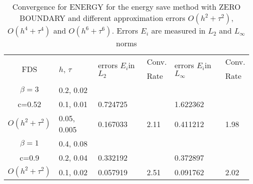 \documentclass{article}
\begin{document}
\begin{table}[ht]
\centering
\small
		\begin{tabular}{||c|l|ll|ll||}
			\hline
			\hline
      \multirow{2  }{*}{FDS}        & \multirow{2  }{*}{$h$, $\tau$}  & \multirow{2  }{*}{errors $E_i$in$L_2$}  &Conv.& \multirow{2  }{*}{errors $E_i$in$L_\infty$}  &Conv.  \\
	                                        &                                                     &                                                                 &  Rate &                                                                       & Rate \\
   			\hline 
					\hline 
  $\beta=3$                &0.2, 0.02         &                    &                &                  &                   \\
   c=0.52                     &0.1, 0.01         & 0.724725   &                & 1.622362  &                   \\
     $O(h^2 + \tau^ 2)$ &0.05, 0.005  & 0.167033   & 2.11       & 0.411212   & 1.98   \\
	   \hline
			\hline 
       $\beta=1$           & 0.4, 0.08       &                   &           &                 &   \\
                  c=0.9       & 0.2, 0.04        & 0.332192   &          &0.372897  &   \\
  $O(h^2+ \tau^2)$  & 0.1, 0.02       & 0.057919   & 2.51  &0.091762  & 2.02  \\
	   \hline
			\hline 
		\end{tabular}
		\caption{ Convergence for ENERGY for the energy save method with ZERO BOUNDARY and different approximation errors $O(h^{2} + \tau^2 )$, $O(h^{4} + \tau^4 )$ and $O(h^{6} + \tau^6 )$. Errors $E_i$ are measured in $L_2$ and $L_\infty$ norms}
\label{tableB}
\end{table}
\end{document}
